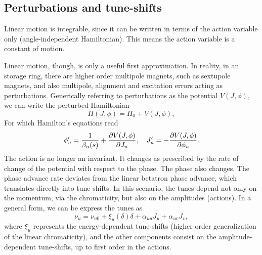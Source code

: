 \subsection{Perturbations and tune-shifts}
Linear motion is integrable, since it can be written in terms of the action variable only (angle-independent Hamiltonian). This means the action variable is a constant of motion.

Linear motion, though, is only a useful first approximation. In reality, in an storage ring, there are higher order multipole magnets, such as sextupole magnets, and also multipole, alignment and excitation errors acting as perturbations. Generically referring to perturbations as the potential $V(J, \phi)$, we can write the perturbed Hamiltonian
\begin{equation}
    H(J,\phi) =H_0 + V(J,\phi),
\end{equation}
For which Hamilton's equations read
\begin{equation}
\phi_u^\prime = \frac{1}{\beta_u(s)}+\pdv{V(J,\phi)}{J_u}, \quad J_u^\prime = -\pdv{V(J,\phi)}{\phi_u}.
\end{equation}
The action is no longer an invariant. It changes as prescribed by the rate of change of the potential with respect to the phase. The phase also changes. The phase advance rate deviates from the linear betatron phase advance, which translates directly into tune-shifts. In this scenario, the tunes depend not only on the momentum, via the chromaticity, but also on the amplitudes (actions). In a general form, we can be express the tunes as
\begin{equation}
    \nu_u = \nu_{u0} + \xi_u(\delta) \delta + \alpha_{uu} J_u + \alpha_{uv} J_v,
\end{equation}
where $\xi_u$ represents the energy-dependent tune-shifts (higher order generalization of the linear chromaticity), and the other components consist on the amplitude-dependent tune-shifts, up to first order in the actions.
